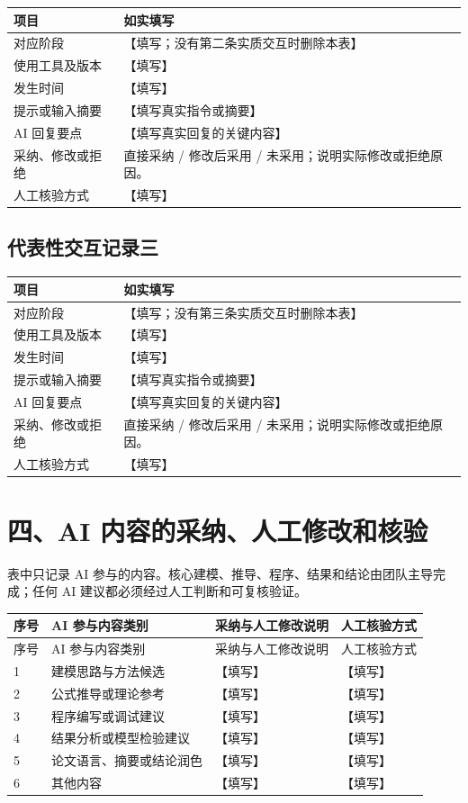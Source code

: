 \documentclass[UTF8,a4paper,11pt]{ctexart}
\begin{document}
\begin{longtable}{p{3.3cm}p{12.6cm}}
  \toprule
  项目 & 如实填写 \\
  \midrule
  对应阶段 & 【填写；没有第二条实质交互时删除本表】 \\
  使用工具及版本 & 【填写】 \\
  发生时间 & 【填写】 \\
  提示或输入摘要 & 【填写真实指令或摘要】 \\
  AI 回复要点 & 【填写真实回复的关键内容】 \\
  采纳、修改或拒绝 & 直接采纳 / 修改后采用 / 未采用；说明实际修改或拒绝原因。 \\
  人工核验方式 & 【填写】 \\
  \bottomrule
\end{longtable}

\subsection*{代表性交互记录三}

\begin{longtable}{p{3.3cm}p{12.6cm}}
  \toprule
  项目 & 如实填写 \\
  \midrule
  对应阶段 & 【填写；没有第三条实质交互时删除本表】 \\
  使用工具及版本 & 【填写】 \\
  发生时间 & 【填写】 \\
  提示或输入摘要 & 【填写真实指令或摘要】 \\
  AI 回复要点 & 【填写真实回复的关键内容】 \\
  采纳、修改或拒绝 & 直接采纳 / 修改后采用 / 未采用；说明实际修改或拒绝原因。 \\
  人工核验方式 & 【填写】 \\
  \bottomrule
\end{longtable}

\section*{四、AI 内容的采纳、人工修改和核验}

表中只记录 AI 参与的内容。核心建模、推导、程序、结果和结论由团队主导完成；任何 AI 建议都必须经过人工判断和可复核验证。

\begin{longtable}{p{0.6cm}p{3.2cm}p{5.8cm}p{6.0cm}}
  \toprule
  序号 & AI 参与内容类别 & 采纳与人工修改说明 & 人工核验方式 \\
  \midrule
  \endfirsthead
  \toprule
  序号 & AI 参与内容类别 & 采纳与人工修改说明 & 人工核验方式 \\
  \midrule
  \endhead
  1 & 建模思路与方法候选 & 【填写】 & 【填写】 \\
  2 & 公式推导或理论参考 & 【填写】 & 【填写】 \\
  3 & 程序编写或调试建议 & 【填写】 & 【填写】 \\
  4 & 结果分析或模型检验建议 & 【填写】 & 【填写】 \\
  5 & 论文语言、摘要或结论润色 & 【填写】 & 【填写】 \\
  6 & 其他内容 & 【填写】 & 【填写】 \\
  \bottomrule
\end{longtable}
\end{document}

